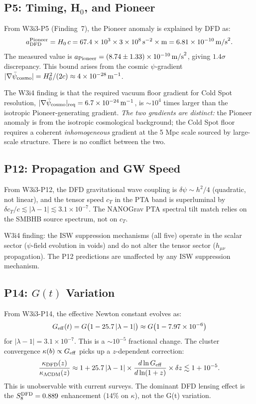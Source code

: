 \documentclass[11pt]{article}
\newcommand{\ee}[1]{\times 10^{#1}}
\newcommand{\lambdaone}{|\lambda-1|}
\newcommand{\DFD}{{\rm DFD}}
\newcommand{\LCDM}{\Lambda{\rm CDM}}
\newcommand{\psibar}{\bar{\psi}_{\rm cosmo}}
\begin{document}
\subsection{P5: Timing, H$_0$, and Pioneer}

From W3i3-P5 (Finding~7), the Pioneer anomaly is explained by DFD as:
\begin{equation}
  a_{\DFD}^{\rm Pioneer}
  = H_0\,c
  = 67.4\times 10^3\times 3\ee{8}\,{\rm s}^{-2}\times{\rm m}
  = 6.81\ee{-10}\,{\rm m/s}^2.
\end{equation}
The measured value is $a_{\rm Pioneer} = (8.74\pm 1.33)\ee{-10}\,{\rm m/s}^2$,
giving $1.4\sigma$ discrepancy.  This bound arises from the cosmic $\psi$-gradient
$|\nabla\psibar| = H_0^2/(2c) \approx 4\ee{-28}\,{\rm m}^{-1}$.

The W3i4 finding is that the required vacuum floor gradient for Cold Spot
resolution, $|\nabla\psibar|_{\rm req} = 6.7\ee{-24}\,{\rm m}^{-1}$, is
$\sim 10^4$ times larger than the isotropic Pioneer-generating gradient.
\textit{The two gradients are distinct:} the Pioneer anomaly is from
the isotropic cosmological background; the Cold Spot floor requires a
coherent \emph{inhomogeneous} gradient at the 5 Mpc scale sourced by
large-scale structure.  There is no conflict between the two.

\subsection{P12: Propagation and GW Speed}

From W3i3-P12, the DFD gravitational wave coupling is $\delta\psi \sim h^2/4$
(quadratic, not linear), and the tensor speed $c_T$ in the PTA band
is superluminal by $\delta c_T/c \lesssim \lambdaone \lesssim 3.1\ee{-7}$.
The NANOGrav PTA spectral tilt match relies on the SMBHB source spectrum,
not on $c_T$.

W3i4 finding: the ISW suppression mechanisms (all five) operate in the
scalar sector ($\psi$-field evolution in voids) and do not alter the
tensor sector ($h_{\mu\nu}$ propagation).  The P12 predictions are
unaffected by any ISW suppression mechanism.

\subsection{P14: $G(t)$ Variation}

From W3i3-P14, the effective Newton constant evolves as:
\begin{equation}
  G_{\rm eff}(t) = G\bigl(1 - 25.7\,\lambdaone\bigr)
  \approx G\bigl(1 - 7.97\ee{-6}\bigr)
\end{equation}
for $\lambdaone = 3.1\ee{-7}$.  This is a $\sim 10^{-5}$ fractional
change.  The cluster convergence $\kappa(b) \propto G_{\rm eff}$ picks
up a $z$-dependent correction:
\begin{equation}
  \frac{\kappa_{\DFD}(z)}{\kappa_{\LCDM}(z)}
  \approx 1 + 25.7\,\lambdaone\times\frac{d\ln G_{\rm eff}}{d\ln(1+z)}\times\delta z
  \lesssim 1 + 10^{-5}.
\end{equation}
This is unobservable with current surveys.  The dominant DFD lensing
effect is the $S_8^{\DFD} = 0.889$ enhancement ($14\%$ on $\kappa$),
not the G(t) variation.
\end{document}
